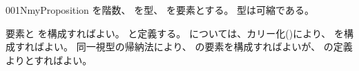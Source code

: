 \documentclass[index]{subfiles}
\begin{document}
\begin{myBlock}{001N}{myProposition}
  を階数、
  を型、
  を要素とする。
  型は可縮である。
\end{myBlock}
\begin{myProof}
  要素と
  を構成すればよい。
  と定義する。
  については、カリー化()により、
  を構成すればよい。
  同一視型の帰納法により、
  の要素を構成すればよいが、
  の定義よりとすればよい。
\end{myProof}
\end{document}
